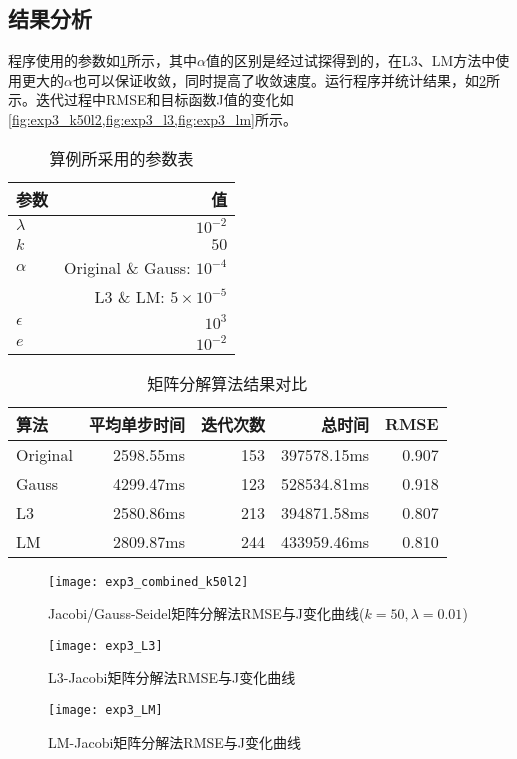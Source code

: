 \documentclass[a4paper,12pt]{article}
\begin{document}
    \subsection{结果分析}
    程序使用的参数如\cref{tbl:exp3para}所示，其中$\alpha$值的区别是经过试探得到的，在L3、LM方法中使用更大的$\alpha$也可以保证收敛，同时提高了收敛速度。运行程序并统计结果，如\cref{tbl:exp3}所示。迭代过程中RMSE和目标函数J值的变化如\cref{fig:exp3_k50l2,fig:exp3_l3,fig:exp3_lm}所示。

    \begin{table}
      \centering
      \caption{算例所采用的参数表}
      \label{tbl:exp3para}
      \begin{tabular}{lr}
        \toprule
        参数&值\\
        \midrule
        $\lambda$ & $10^{-2}$ \\
        $k$ & $50$ \\
        $\alpha$ & Original \& Gauss: $10^{-4}$\\
         & L3 \& LM: $5\times 10^{-5}$ \\
        $\epsilon$ & $10^{3}$ \\
        $e$ & $10^{-2}$ \\
        \bottomrule
      \end{tabular}
    \end{table}

    \begin{table}
      \centering
      \caption{矩阵分解算法结果对比}
      \label{tbl:exp3}
      \begin{tabular}{lrrrr}
        \toprule
        算法&平均单步时间&迭代次数&总时间&RMSE\\
        \midrule
        Original & 2598.55ms & 153 & 397578.15ms & 0.907 \\
        Gauss & 4299.47ms & 123 & 528534.81ms & 0.918 \\
        L3 & 2580.86ms & 213 & 394871.58ms & 0.807 \\
        LM & 2809.87ms & 244 & 433959.46ms & 0.810 \\
        \bottomrule
      \end{tabular}
    \end{table}

    \begin{figure}[htbp]
      \centering
      \texttt{[image: exp3\_combined\_k50l2]}
      \caption{Jacobi/Gauss-Seidel矩阵分解法RMSE与J变化曲线($k=50,\lambda=0.01$)}
      \label{fig:exp3_k50l2}
    \end{figure}
    \begin{figure}[htbp]
      \centering
      \texttt{[image: exp3\_L3]}
      \caption{L3-Jacobi矩阵分解法RMSE与J变化曲线}
      \label{fig:exp3_l3}
    \end{figure}
    \begin{figure}[htbp]
      \centering
      \texttt{[image: exp3\_LM]}
      \caption{LM-Jacobi矩阵分解法RMSE与J变化曲线}
      \label{fig:exp3_lm}
    \end{figure}
\end{document}
